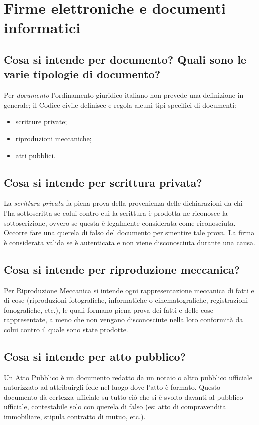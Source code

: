 \newpage
\section{Firme elettroniche e documenti informatici}
\subsection{Cosa si intende per documento? Quali sono le varie tipologie di documento?}
Per \textit{documento} l'ordinamento giuridico italiano non prevede una definizione in generale;
il Codice civile definisce e regola alcuni tipi specifici di documenti:
\begin{itemize}
    \item scritture private;
    \item riproduzioni meccaniche;
    \item atti pubblici.
\end{itemize}

\subsection{Cosa si intende per scrittura privata?}
La \textit{scrittura privata} fa piena prova della provenienza delle dichiarazioni da chi l'ha
sottoscritta se colui contro cui la scrittura è prodotta ne riconosce la sottoscrizione,
ovvero se questa è legalmente considerata come riconosciuta.\newline
Occorre fare una querela di falso del documento per smentire tale prova.\newline
La firma è considerata valida se è autenticata e non viene disconosciuta durante una causa.

\subsection{Cosa si intende per riproduzione meccanica?}
Per Riproduzione Meccanica si intende ogni rappresentazione meccanica di fatti e di cose
(riproduzioni fotografiche, informatiche o cinematografiche, registrazioni fonografiche, etc.),
le quali formano piena prova dei fatti e delle cose rappresentate, a meno che non vengano disconosciute
nella loro conformità da colui contro il quale sono state prodotte.

\subsection{Cosa si intende per atto pubblico?}
Un Atto Pubblico è un documento redatto da un notaio o altro pubblico ufficiale autorizzato
ad attribuirgli fede nel luogo dove l'atto è formato.
Questo documento dà certezza ufficiale su tutto ciò che si è svolto davanti al pubblico ufficiale,
contestabile solo con querela di falso (es: atto di compravendita immobiliare, stipula contratto di mutuo, etc.).

